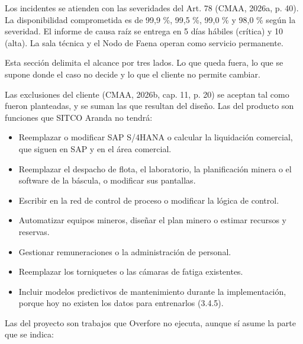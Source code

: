 \documentclass[subdoc]{../../comun/overfore}
\begin{document}
Los incidentes se atienden con las severidades del Art. 78 (CMAA, 2026a, p. 40). La disponibilidad comprometida es de 99,9 \%, 99,5 \%, 99,0 \% y 98,0 \% según la severidad. El informe de causa raíz se entrega en 5 días hábiles (crítica) y 10 (alta). La sala técnica y el Nodo de Faena operan como servicio permanente.

Esta sección delimita el alcance por tres lados. Lo que queda fuera, lo que se supone donde el caso no decide y lo que el cliente no permite cambiar.

Las exclusiones del cliente (CMAA, 2026b, cap. 11, p. 20) se aceptan tal como fueron planteadas, y se suman las que resultan del diseño. Las del producto son funciones que SITCO Aranda no tendrá:

\begin{itemize}
\item Reemplazar o modificar SAP S/4HANA o calcular la liquidación comercial, que siguen en SAP y en el área comercial.
\item Reemplazar el despacho de flota, el laboratorio, la planificación minera o el software de la báscula, o modificar sus pantallas.
\item Escribir en la red de control de proceso o modificar la lógica de control.
\item Automatizar equipos mineros, diseñar el plan minero o estimar recursos y reservas.
\item Gestionar remuneraciones o la administración de personal.
\item Reemplazar los torniquetes o las cámaras de fatiga existentes.
\item Incluir modelos predictivos de mantenimiento durante la implementación, porque hoy no existen los datos para entrenarlos (3.4.5).
\end{itemize}
Las del proyecto son trabajos que Overfore no ejecuta, aunque sí asume la parte que se indica:
\end{document}
